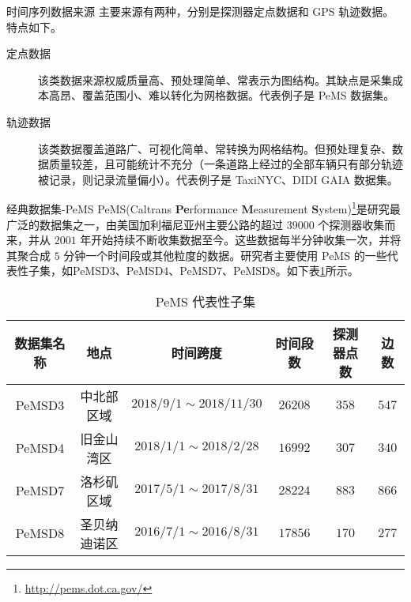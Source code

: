 \documentclass{libs/format}
\begin{document}
\begin{frame}{时间序列数据来源}
  主要来源有两种，分别是探测器定点数据和 GPS 轨迹数据。特点如下。
  \begin{description}
    \item[定点数据] 该类数据来源权威质量高、预处理简单、常表示为图结构。其缺点是采集成本高昂、覆盖范围小、难以转化为网格数据。代表例子是 PeMS 数据集。
    \item[轨迹数据] 该类数据覆盖道路广、可视化简单、常转换为网格结构。但预处理复杂、数据质量较差，且可能统计不充分（一条道路上经过的全部车辆只有部分轨迹被记录，则记录流量偏小）。代表例子是 TaxiNYC、DIDI GAIA 数据集。
  \end{description}
\end{frame}

\begin{frame}{经典数据集-PeMS}
  PeMS(Caltrans \textbf{Pe}rformance \textbf{M}easurement \textbf{S}ystem)\footnote[frame]{\url{http://pems.dot.ca.gov/}}是研究最广泛的数据集之一，由美国加利福尼亚州主要公路的超过 $39000$ 个探测器收集而来，并从 $2001$ 年开始持续不断收集数据至今。这些数据每半分钟收集一次，并将其聚合成 $5$ 分钟一个时间段或其他粒度的数据。研究者主要使用 PeMS 的一些代表性子集，如PeMSD3、PeMSD4、PeMSD7、PeMSD8。\cite{T-81}如下表\ref{table:pems}所示。

  \setlength{\tabcolsep}{2pt}
  \begin{footnotesize}
  \begin{table}[]  
    \centering\caption{PeMS 代表性子集}\label{table:pems}
    \begin{tabular}{|c|c|c|c|c|c|}  
    \hline  
    数据集名称 & 地点 & 时间跨度 & 时间段数 & 探测器点数 & 边数 \\ \hline  
    PeMSD3 & 中北部区域 & $2018/9/1\sim2018/11/30$ & $26208$ & $358$ & $547$ \\ \hline  
    PeMSD4 & 旧金山湾区 & $2018/1/1\sim2018/2/28$ & $16992$ & $307$ & $340$ \\ \hline  
    PeMSD7 & 洛杉矶区域 & $2017/5/1\sim2017/8/31$ & $28224$ & $883$ & $866$ \\ \hline  
    PeMSD8 & 圣贝纳迪诺区 & $2016/7/1\sim2016/8/31$ & $17856$ & $170$ & $277$ \\ \hline  
    \end{tabular}  
  \end{table}
  \end{footnotesize}
  
\end{frame}
\end{document}
